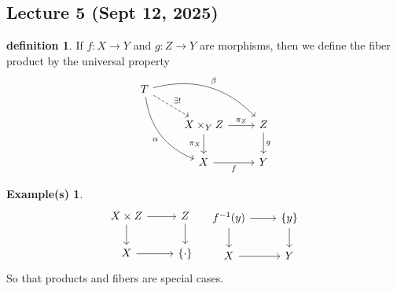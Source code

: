 \documentclass[10.5pt]{article}
\theoremstyle{definition}
\newtheorem{definition}{definition}
\newtheorem*{example}{Example(s)}
\newcommand{\set}[1]{\{#1\}}
\begin{document}

    \subsection{Lecture 5 (Sept 12, 2025)}

    \begin{definition}
        If \(f: X \to Y\) and \(g: Z \to Y\) are morphisms, then we define the fiber product by the universal property
        \begin{equation*}
            \begin{tikzcd}
                T
                \arrow[bend left]{drr}{\beta}
                \arrow[bend right,swap]{ddr}{\alpha}
                \arrow[dashed]{dr}{\exists !} & & \\
                & X \times_Y Z \arrow{r}{\pi_Z} \arrow{d}[swap]{\pi_X}
                & Z \arrow{d}{g} \\
                & X \arrow[swap]{r}{f}
                & Y
            \end{tikzcd}
        \end{equation*}
    \end{definition}
    \begin{example}
        \begin{equation*}
            \begin{tikzcd}
                X \times Z \arrow[r] \arrow[d] &Z \arrow[d] \\ X \arrow[r] & \set{\cdot}
            \end{tikzcd} \quad
            \begin{tikzcd}
                f^{-1}(y) \arrow[r] \arrow[d] &\set{y} \arrow[d] \\ X \arrow[r] & Y
            \end{tikzcd}
        \end{equation*}
        So that products and fibers are special cases.
    \end{example}

\end{document}
